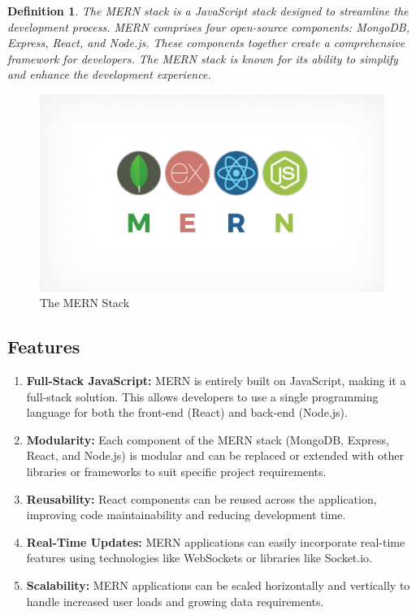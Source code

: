 \documentclass[11pt]{article}
\newtheorem{dfn}[thm]{Definition}
\begin{document}
\begin{dfn}
    The MERN stack is a JavaScript stack designed to streamline the development process. MERN comprises four open-source components: MongoDB, Express, React, and Node.js. These components together create a comprehensive framework for developers. The MERN stack is known for its ability to simplify and enhance the development experience.
\end{dfn}

\begin{figure}[H]
    \centering
    \includegraphics[width=.55\textwidth]{MERN Stack/MERN Stack_2.jpg}
    \caption{The MERN Stack}
\end{figure}

\subsection{Features}

\begin{enumerate}
    \item \textbf{Full-Stack JavaScript:} MERN is entirely built on JavaScript, making it a full-stack solution. This allows developers to use a single programming language for both the front-end (React) and back-end (Node.js).

    \item \textbf{Modularity:} Each component of the MERN stack (MongoDB, Express, React, and Node.js) is modular and can be replaced or extended with other libraries or frameworks to suit specific project requirements.

    \item \textbf{Reusability:} React components can be reused across the application, improving code maintainability and reducing development time.

    \item \textbf{Real-Time Updates:} MERN applications can easily incorporate real-time features using technologies like WebSockets or libraries like Socket.io.

    \item \textbf{Scalability:} MERN applications can be scaled horizontally and vertically to handle increased user loads and growing data requirements.

\end{enumerate}
\end{document}
